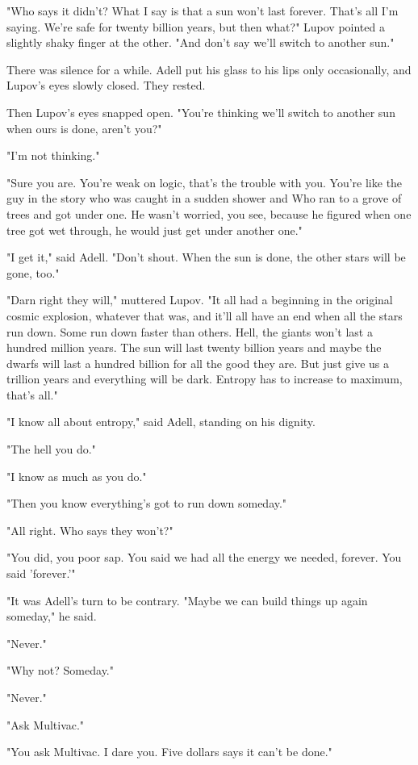 \documentclass[11pt]{article}
\begin{document}
"Who says it didn't? What I say is that a sun won't last forever. That's all I'm saying. We're safe for twenty billion years, but then what?" Lupov pointed a slightly shaky finger at the other. "And don't say we'll switch to another sun."

There was silence for a while. Adell put his glass to his lips only occasionally, and Lupov's eyes slowly closed. They rested.

Then Lupov's eyes snapped open. "You're thinking we'll switch to another sun when ours is done, aren't you?"

"I'm not thinking."

"Sure you are. You're weak on logic, that's the trouble with you. You're like the guy in the story who was caught in a sudden shower and Who ran to a grove of trees and got under one. He wasn't worried, you see, because he figured when one tree got wet through, he would just get under another one."

"I get it," said Adell. "Don't shout. When the sun is done, the other stars will be gone, too."

"Darn right they will," muttered Lupov. "It all had a beginning in the original cosmic explosion, whatever that was, and it'll all have an end when all the stars run down. Some run down faster than others. Hell, the giants won't last a hundred million years. The sun will last twenty billion years and maybe the dwarfs will last a hundred billion for all the good they are. But just give us a trillion years and everything will be dark. Entropy has to increase to maximum, that's all."

"I know all about entropy," said Adell, standing on his dignity.

"The hell you do."

"I know as much as you do."

"Then you know everything's got to run down someday."

"All right. Who says they won't?"

"You did, you poor sap. You said we had all the energy we needed, forever. You said 'forever.'"

"It was Adell's turn to be contrary. "Maybe we can build things up again someday," he said.

"Never."

"Why not? Someday."

"Never."

"Ask Multivac."

"You ask Multivac. I dare you. Five dollars says it can't be done."
\end{document}
